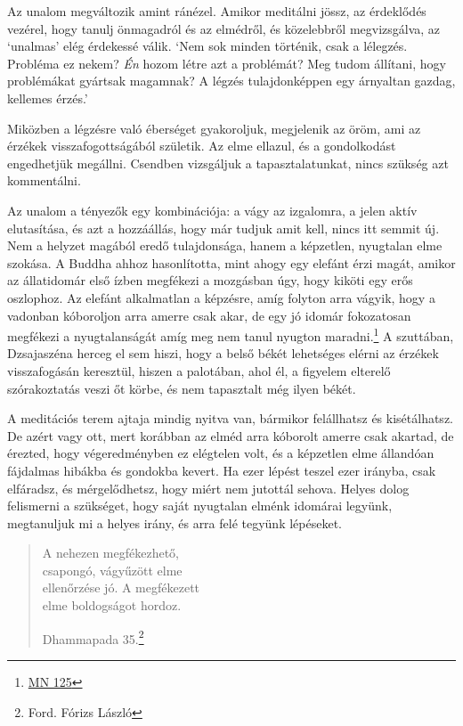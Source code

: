 Az unalom megváltozik amint ránézel. Amikor meditálni jössz, az
érdeklődés vezérel, hogy tanulj önmagadról és az elmédről, és
közelebbről megvizsgálva, az `unalmas' elég érdekessé válik. `Nem sok
minden történik, csak a lélegzés. Probléma ez nekem? \emph{Én} hozom
létre azt a problémát? Meg tudom állítani, hogy problémákat gyártsak
magamnak? A légzés tulajdonképpen egy árnyaltan gazdag, kellemes érzés.'

Miközben a légzésre való éberséget gyakoroljuk, megjelenik az öröm, ami
az érzékek visszafogottságából születik. Az elme ellazul, és a
gondolkodást engedhetjük megállni. Csendben vizsgáljuk a
tapasztalatunkat, nincs szükség azt kommentálni.

Az unalom a tényezők egy kombinációja: a vágy az izgalomra, a jelen
aktív elutasítása, és azt a hozzáállás, hogy már tudjuk amit kell, nincs
itt semmit új. Nem a helyzet magából eredő tulajdonsága, hanem a
képzetlen, nyugtalan elme szokása. A Buddha ahhoz hasonlította, mint
ahogy egy elefánt érzi magát, amikor az állatidomár első ízben megfékezi
a mozgásban úgy, hogy kiköti egy erős oszlophoz. Az elefánt alkalmatlan
a képzésre, amíg folyton arra vágyik, hogy a vadonban kóboroljon arra
amerre csak akar, de egy jó idomár fokozatosan megfékezi a
nyugtalanságát amíg meg nem tanul nyugton maradni.\footnote{\href{https://suttacentral.net/mn125/en/sujato}{MN
  125}} A szuttában, Dzsajaszéna herceg el sem hiszi, hogy a belső békét
lehetséges elérni az érzékek visszafogásán keresztül, hiszen a
palotában, ahol él, a figyelem elterelő szórakoztatás veszi őt körbe, és
nem tapasztalt még ilyen békét.

A meditációs terem ajtaja mindig nyitva van, bármikor felállhatsz és
kisétálhatsz. De azért vagy ott, mert korábban az elméd arra kóborolt
amerre csak akartad, de érezted, hogy végeredményben ez elégtelen volt,
és a képzetlen elme állandóan fájdalmas hibákba és gondokba kevert. Ha
ezer lépést teszel ezer irányba, csak elfáradsz, és mérgelődhetsz, hogy
miért nem jutottál sehova. Helyes dolog felismerni a szükséget, hogy
saját nyugtalan elménk idomárai legyünk, megtanuljuk mi a helyes irány,
és arra felé tegyünk lépéseket.

\begin{quote}
A nehezen megfékezhető,\\
csapongó, vágyűzött elme\\
ellenőrzése jó. A megfékezett\\
elme boldogságot hordoz.

Dhammapada 35.\footnote{Ford. Fórizs László}
\end{quote}

